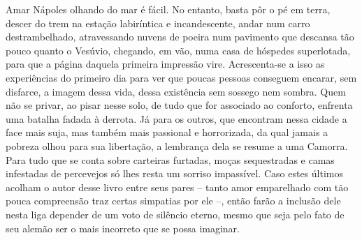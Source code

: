 Amar Nápoles olhando do mar é fácil. No entanto, basta pôr o pé em
terra, descer do trem na estação labiríntica e incandescente, andar num
carro destrambelhado, atravessando nuvens de poeira num pavimento que
descansa tão pouco quanto o Vesúvio, chegando, em vão, numa casa de
hóspedes superlotada, para que a página daquela primeira impressão vire.
Acrescenta-se a isso as experiências do primeiro dia para ver que poucas
pessoas conseguem encarar, sem disfarce, a imagem dessa vida, dessa
existência sem sossego nem sombra. Quem não se privar, ao pisar nesse
solo, de tudo que for associado ao conforto, enfrenta uma batalha fadada
à derrota. Já para os outros, que encontram nessa cidade a face mais
suja, mas também mais passional e horrorizada, da qual jamais a pobreza
olhou para sua libertação, a lembrança dela se resume a uma Camorra.
Para tudo que se conta sobre carteiras furtadas, moças sequestradas e
camas infestadas de percevejos só lhes resta um sorriso impassível. Caso
estes últimos acolham o autor desse livro entre seus pares -- tanto amor
emparelhado com tão pouca compreensão traz certas simpatias por ele --,
então farão a inclusão dele nesta liga depender de um voto de silêncio
eterno, mesmo que seja pelo fato de seu alemão ser o mais incorreto que
se possa imaginar.

